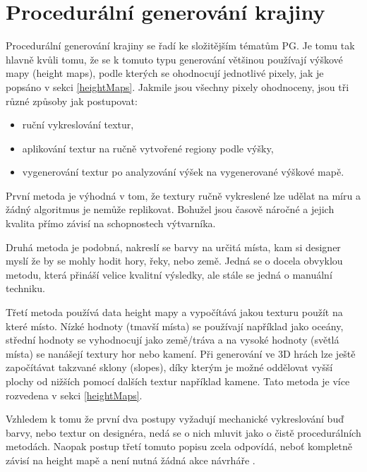 \chapter{Procedurální generování krajiny}
\label{terrain}
Procedurální generování krajiny se řadí ke složitějším tématům PG. Je tomu tak hlavně kvůli tomu, že se k tomuto typu generování většinou používají výškové mapy (height maps), podle kterých se ohodnocují jednotlivé pixely, jak je popsáno v sekci \ref{heightMaps}. Jakmile jsou všechny pixely ohodnoceny, jsou tři různé způsoby jak postupovat:
\begin{itemize}
	\item ruční vykreslování textur,
	\item aplikování textur na ručně vytvořené regiony podle výšky,
	\item vygenerování textur po analyzování výšek na vygenerované výškové mapě.
\end{itemize}
První metoda je výhodná v tom, že textury ručně vykreslené lze udělat na míru a žádný algoritmus je nemůže replikovat. Bohužel jsou časově náročné a jejich kvalita přímo závisí na schopnostech výtvarníka.

Druhá metoda je podobná, nakreslí se barvy na určitá místa, kam si designer myslí že by se mohly hodit hory, řeky, nebo země. Jedná se o docela obvyklou metodu, která přináší velice kvalitní výsledky, ale stále se jedná o manuální techniku.

Třetí metoda používá data height mapy a vypočítává jakou texturu použít na které místo. Nízké hodnoty (tmavší místa) se používají například jako oceány, střední hodnoty se vyhodnocují jako země/tráva a na vysoké hodnoty (světlá místa) se nanášejí textury hor nebo kamení. Při generování ve 3D hrách lze ještě započítávat takzvané sklony (slopes), díky kterým je možné oddělovat vyšší plochy od nižších pomocí dalších textur například kamene. Tato metoda je více rozvedena v sekci \ref{heightMaps}.

Vzhledem k tomu že první dva postupy vyžadují mechanické vykreslování buď barvy, nebo textur on designéra, nedá se o nich mluvit jako o čistě procedurálních metodách. Naopak postup třetí tomuto popisu zcela odpovídá, neboť kompletně závisí na height mapě a není nutná žádná akce návrháře \cite{madoc59000}.

